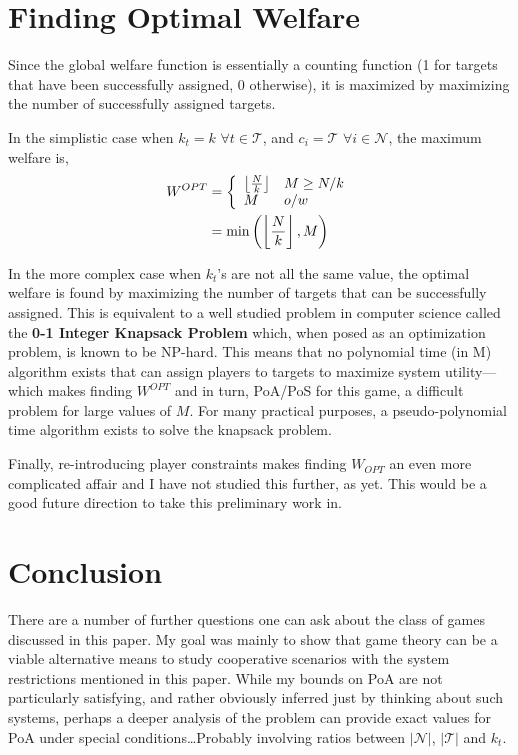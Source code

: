 \documentclass[11pt, onecolumn, compsoc, letterpaper]{article}
\DeclarePairedDelimiter\floor{\lfloor}{\rfloor}
\newcommand{\Pl}{\mathcal{N}} %
\newcommand{\Ta}{\mathcal{T}} %
\begin{document}
\section{Finding Optimal Welfare}
Since the global welfare function is essentially a counting function (1 for targets that have been successfully assigned, 0 otherwise), it is maximized by maximizing the number of successfully assigned targets.

In the simplistic case when $k_t = k$ $\forall t \in \Ta$, and $c_i = \Ta$ $\forall i \in \Pl$, the maximum welfare is,
\begin{align}
	W^{OPT} & = \left\{
	\begin{array}{ll}
		\floor*{\frac{N}{k}} & M \geq N/k\\
		M & o/w
	\end{array}
	\right.\notag\\
	& = \min\left(\left\lfloor\frac{N}{k}\right\rfloor, M\right)
\end{align}

In the more complex case when $k_t$'s are not all the same value, the optimal welfare is found by maximizing the number of targets that can be successfully assigned. This is equivalent to a well studied problem in computer science called the \textbf{0-1 Integer Knapsack Problem} which, when posed as an optimization problem, is known to be NP-hard. This means that no polynomial time (in M) algorithm exists that can assign players to targets to maximize system utility---which makes finding $W^{OPT}$ and in turn, PoA/PoS for this game, a difficult problem for large values of $M$. For many practical purposes, a pseudo-polynomial time algorithm exists to solve the knapsack problem.

Finally, re-introducing player constraints makes finding $W_{OPT}$ an even more complicated affair and I have not studied this further, as yet. This would be a good future direction to take this preliminary work in.


\section{Conclusion}
There are a number of further questions one can ask about the class of games discussed in this paper. My goal was mainly to show that game theory can be a viable alternative means to study cooperative scenarios with the system restrictions mentioned in this paper. While my bounds on PoA are not particularly satisfying, and rather obviously inferred just by thinking about such systems, perhaps a deeper analysis of the problem can provide exact values for PoA under special conditions\ldots Probably involving ratios between $|\Pl|$, $|\Ta|$ and $k_t$.
\end{document}
